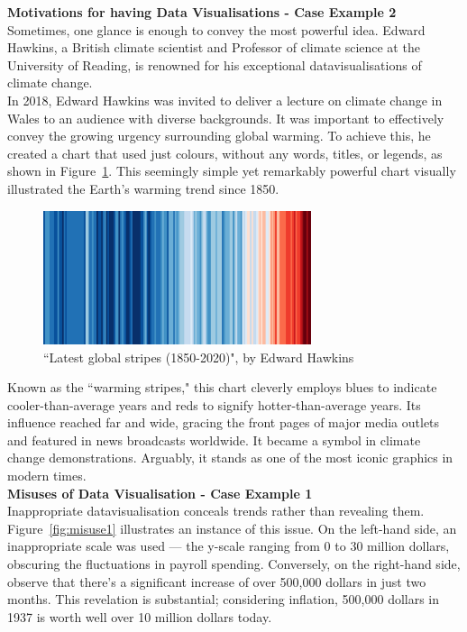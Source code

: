 \documentclass{article}\usepackage[]{graphicx}\usepackage[]{xcolor}
\begin{document}
\noindent
\textbf{Motivations for having Data Visualisations - Case Example 2}\\

\noindent
Sometimes, one glance is enough to convey the most powerful idea. Edward Hawkins, a British climate scientist and Professor of climate science at the University of Reading, is renowned for his exceptional datavisualisations of climate change.\\

\noindent
In 2018, Edward Hawkins was invited to deliver a lecture on climate change in Wales to an audience with diverse backgrounds. It was important to effectively convey the growing urgency surrounding global warming. To achieve this, he created a chart that used just colours, without any words, titles, or legends, as shown in Figure~\ref{fig:global}. This seemingly simple yet remarkably powerful chart visually illustrated the Earth's warming trend since 1850.

\begin{figure}[H]
    \centering
    \includegraphics[width=0.7\textwidth]{global.png}
    \caption{``Latest global stripes (1850-2020)", by Edward Hawkins\cite{blog}}
    \label{fig:global}
\end{figure}

\noindent 
Known as the ``warming stripes," this chart cleverly employs blues to indicate cooler-than-average years and reds to signify hotter-than-average years. Its influence reached far and wide, gracing the front pages of major media outlets and featured in news broadcasts worldwide. It became a symbol in climate change demonstrations. Arguably, it stands as one of the most iconic graphics in modern times.\\

\noindent
\textbf{Misuses of Data Visualisation - Case Example 1}\\

\noindent
Inappropriate datavisualisation conceals trends rather than revealing them. Figure~\ref{fig:misuse1} illustrates an instance of this issue. On the left-hand side, an inappropriate scale was used --- the y-scale ranging from 0 to 30 million dollars, obscuring the fluctuations in payroll spending. Conversely, on the right-hand side, observe that there's a significant increase of over 500,000 dollars in just two months. This revelation is substantial; considering inflation, 500,000 dollars in 1937 is worth well over 10 million dollars today\cite{worth}.
\end{document}
